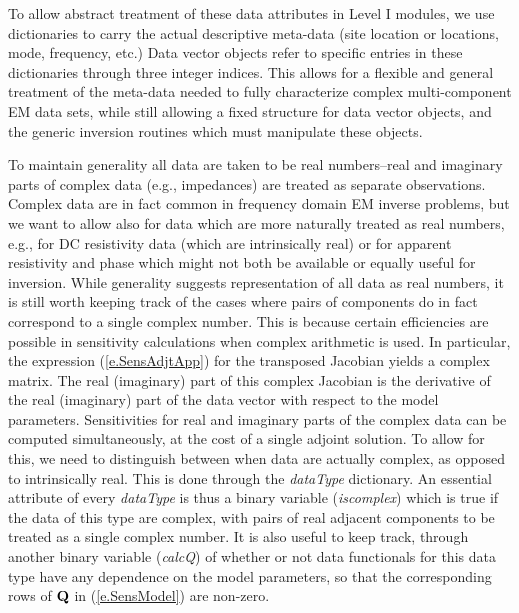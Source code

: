 To allow abstract treatment of these
data attributes in Level I modules, we use dictionaries
to carry the actual descriptive meta-data (site location or
locations, mode, frequency, etc.)  Data vector objects refer to
specific entries in these dictionaries through three
integer indices.  This allows for a flexible and general
treatment of the meta-data needed to fully characterize complex
multi-component EM data sets, while still allowing a fixed structure
for data vector objects, and the generic inversion routines
which must manipulate these objects.

To maintain generality all data are taken to be real numbers--real
and imaginary parts of complex 
data (e.g., impedances) are treated as separate observations.
Complex data are in fact common in frequency
domain EM inverse problems,
but we want to allow also for data which are more 
naturally treated as real numbers, e.g., for DC resistivity
data (which are intrinsically real)
or for apparent resistivity and phase which might not
both be available or equally useful for inversion.
While generality suggests representation
of all data as real numbers, it is still worth keeping track of the
cases where pairs of components do in fact correspond
to a single complex number.  This is because
certain efficiencies are possible in sensitivity calculations
when complex arithmetic is used.  In particular,
the expression (\ref{e.SensAdjtApp}) for the transposed Jacobian 
yields a complex matrix.  The real (imaginary) part of this
complex Jacobian is the derivative of the real (imaginary)
part of the data vector with respect to the model parameters.
Sensitivities for real and imaginary parts of the
complex data can be computed simultaneously, 
at the cost of a single adjoint solution.  
To allow for this, we need to distinguish between when data
are actually complex, as opposed to intrinsically real.  This is
done through the {\it dataType} dictionary.  An essential
attribute of every {\em dataType} is thus a binary variable
({\it iscomplex}) which is true if the data of this type are
complex, with pairs of real adjacent 
components to be treated as a single complex number.
It is also useful to keep track, through another binary variable
({\it calcQ}) of whether or not data functionals for this
data type have any dependence on the model parameters,
so that the corresponding rows of ${\bf Q}$ in 
(\ref{e.SensModel}) are non-zero.

